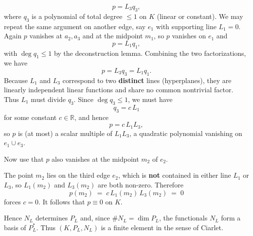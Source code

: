 \[
    p = L_3 q_3,
\]
where $q_3$ is a polynomial of total degree $\le 1$ on $K$ (linear or constant).
We may repeat the same argument on another edge, say $e_1$ with supporting line $L_1=0$.
Again $p$ vanishes at $a_2,a_3$ and at the midpoint $m_1$, so $p$ vanishes on $e_1$ and
\[
    p = L_1 q_1,
\]
with $\deg q_1 \le 1$ by the deconstruction lemma.
Combining the two factorizations, we have
\[
    p = L_3 q_3 = L_1 q_1.
\]
Because $L_1$ and $L_3$ correspond to two \textbf{distinct} lines (hyperplanes),
they are linearly independent linear functions and share no common nontrivial factor.
Thus $L_1$ must divide $q_3$. Since $\deg q_3 \le 1$, we must have
\[
    q_3 = c\,L_1
\]
for some constant $c\in\mathbb{R}$, and hence
\[
    p = c\,L_1 L_3,
\]
so $p$ is (at most) a scalar multiple of $L_1L_3$, a quadratic polynomial vanishing on $e_1 \cup e_3$.

Now use that $p$ also vanishes at the midpoint $m_2$ of $e_2$.

The point $m_2$ lies on the third edge $e_2$, which is \textbf{not} contained in either line $L_1$ or $L_3$, so $L_1(m_2)$ and $L_3(m_2)$ are both non-zero. Therefore
\[
    p(m_2) \;=\; c\,L_1(m_2)\,L_3(m_2) \;=\; 0
\]
forces $c = 0$. It follows that $p \equiv 0$ on $K$.

Hence $N_L$ determines $P_L$ and, since $\#N_L=\dim P_L$, the functionals $N_L$ form a basis of $P_L^\ast$. Thus $(K,P_L,N_L)$ is a finite element in the sense of Ciarlet.

